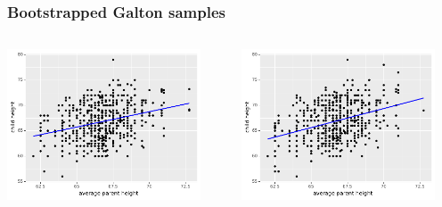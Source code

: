 \documentclass[handout]{beamer}
\begin{document}
\begin{frame}
	\frametitle{Bootstrapped Galton samples}
	
	\begin{columns}
		\begin{column}{0.48\textwidth}
			\includegraphics[width=0.9\textwidth]{../figures/galton_0.pdf}
			\end{column}
			\begin{column}{0.48\textwidth}
				\includegraphics[width=0.9\textwidth]{../figures/galton_1.pdf}
			\end{column}
	\end{columns}
	

\end{frame}
\end{document}

